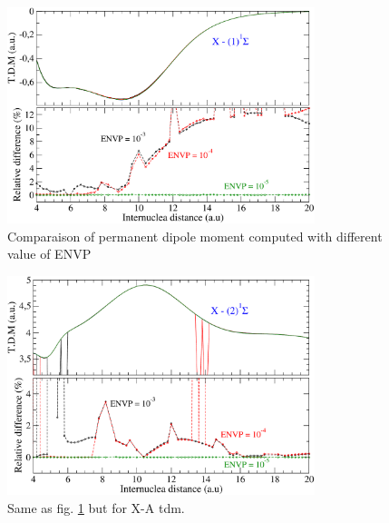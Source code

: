 \documentclass[a4paper,10pt]{article}
\begin{document}
 \begin{figure}[ht!]
  \begin{center}
        \includegraphics[width=0.8\textwidth]{fig/tdm_1ssp.pdf}
    \caption{\label{tdm1} \small Comparaison of permanent dipole moment computed with different value of ENVP}
  \end{center}
\end{figure}

 \begin{figure}[hb!]
  \begin{center}
        \includegraphics[width=0.8\textwidth]{fig/tdm_2ssp.pdf}
    \caption{\label{tdm2} \small Same as fig. \ref{tdm1} but for X-A tdm.}
  \end{center}
\end{figure}

\pagebreak
\end{document}
